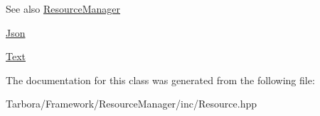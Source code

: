 \begin{DoxySeeAlso}{See also}
\hyperlink{classTarbora_1_1ResourceManager}{Resource\+Manager} 

\hyperlink{classTarbora_1_1Json}{Json} 

\hyperlink{classTarbora_1_1Text}{Text} 
\end{DoxySeeAlso}


The documentation for this class was generated from the following file\+:\begin{DoxyCompactItemize}
\item 
Tarbora/\+Framework/\+Resource\+Manager/inc/Resource.\+hpp\end{DoxyCompactItemize}
